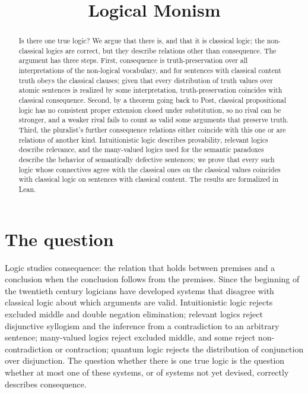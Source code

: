 \documentclass{situationist-preprint}
\title{Logical Monism}
\begin{document}
\maketitle

\begin{abstract}
Is there one true logic? We argue that there is, and that it is classical logic; the non-classical logics are correct, but they describe relations other than consequence. The argument has three steps. First, consequence is truth-preservation over all interpretations of the non-logical vocabulary, and for sentences with classical content truth obeys the classical clauses; given that every distribution of truth values over atomic sentences is realized by some interpretation, truth-preservation coincides with classical consequence. Second, by a theorem going back to Post, classical propositional logic has no consistent proper extension closed under substitution, so no rival can be stronger, and a weaker rival fails to count as valid some arguments that preserve truth. Third, the pluralist's further consequence relations either coincide with this one or are relations of another kind. Intuitionistic logic describes provability, relevant logics describe relevance, and the many-valued logics used for the semantic paradoxes describe the behavior of semantically defective sentences; we prove that every such logic whose connectives agree with the classical ones on the classical values coincides with classical logic on sentences with classical content. The results are formalized in Lean.
\end{abstract}

\section{The question}

Logic studies consequence: the relation that holds between premises and a conclusion when the conclusion follows from the premises. Since the beginning of the twentieth century logicians have developed systems that disagree with classical logic about which arguments are valid. Intuitionistic logic rejects excluded middle and double negation elimination; relevant logics reject disjunctive syllogism and the inference from a contradiction to an arbitrary sentence; many-valued logics reject excluded middle, and some reject non-contradiction or contraction; quantum logic rejects the distribution of conjunction over disjunction. The question whether there is one true logic is the question whether at most one of these systems, or of systems not yet devised, correctly describes consequence.
\end{document}

